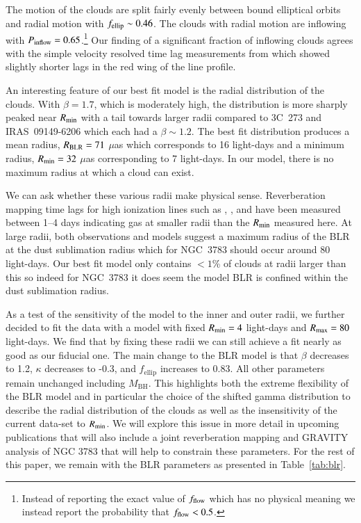 \documentclass[longauth,]{aa}
\newcommand{\mbh}{{\mbox{$M_\mathrm{BH}$}}}
\newcommand{\uas}{{\mbox{$\mu$as}}}
\begin{document}
The motion of the clouds are split fairly evenly between bound elliptical orbits and radial motion with $f_{\rm ellip} \sim 0.46$. The clouds with radial motion are inflowing with $P_{\rm inflow} = 0.65$.\footnote{Instead of reporting the exact value of $f_{\rm flow}$ which has no physical meaning we instead report the probability that $f_{\rm flow} < 0.5$.} Our finding of a significant fraction of inflowing clouds agrees with the simple velocity resolved time lag measurements from \citet{Bentz:2020aa} which showed slightly shorter lags in the red wing of the line profile. 

An interesting feature of our best fit model is the radial distribution of the clouds. With $\beta=1.7$, which is moderately high, the distribution is more sharply peaked near $R_{\rm min}$ with a tail towards larger radii compared to 3C~273 and IRAS~09149-6206 which each had a $\beta\sim1.2$. The best fit distribution produces a mean radius, $R_{\rm BLR}=71$ \uas{} which corresponds to 16 light-days and a minimum radius, $R_{\rm min}=32$ \uas{} corresponding to 7 light-days. In our model, there is no maximum radius at which a cloud can exist. 

We can ask whether these various radii make physical sense. Reverberation mapping time lags for high ionization lines such as , , and  have been measured between 1--4 days \citep{Reichert:1994aa,Onken:2002aa,Bentz:2020aa} indicating gas at smaller radii than the $R_{\rm min}$ measured here. At large radii, both observations and models suggest a maximum radius of the BLR at the dust sublimation radius \citep{Laor:1993aa,Netzer:1993aa,Korista:1997aa,Baskin:2014aa,Schnorr-Muller:2016qy,Suganuma:2006aa} which for NGC~3783 should occur around 80 light-days. Our best fit model only contains $<1$\% of clouds at radii larger than this so indeed for NGC~3783 it does seem the model BLR is confined within the dust sublimation radius.

As a test of the sensitivity of the model to the inner and outer radii, we further decided to fit the data with a model with fixed $R_{\rm min} = 4$ light-days and $R_{\rm max} = 80$ light-days. We find that by fixing these radii we can still achieve a fit nearly as good as our fiducial one. The main change to the BLR model is that $\beta$ decreases to 1.2, $\kappa$ decreases to -0.3, and $f_\mathrm{ellip}$ increases to 0.83. All other parameters remain unchanged including \mbh{}. This highlights both the extreme flexibility of the BLR model and in particular the choice of the shifted gamma distribution to describe the radial distribution of the clouds as well as the insensitivity of the current data-set to $R_{\rm min}$. We will explore this issue in more detail in upcoming publications that will also include a joint reverberation mapping and GRAVITY analysis of NGC 3783 that will help to constrain these parameters. For the rest of this paper, we remain with the BLR parameters as presented in Table~\ref{tab:blr}.
\end{document}
